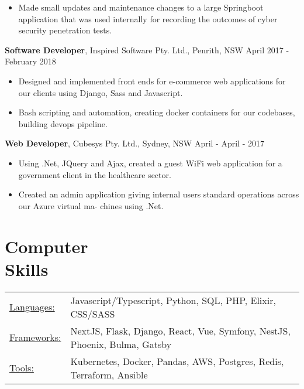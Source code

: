 \documentclass[overlapped]{res}
\begin{document}
\begin{resume}
\begin{itemize}
\item Made small updates and maintenance changes to a large Springboot application that was used internally for recording the outcomes of cyber security penetration tests.

\end{itemize}

{\bf Software Developer},
	Inspired Software Pty. Ltd., Penrith, NSW \hfill April 2017 - February 2018
\begin{itemize} \itemsep 2pt  %

\item Designed and implemented front ends for e-commerce web applications for our clients using Django, Sass and Javascript.

\item Bash scripting and automation, creating docker containers for our codebases, building devops pipeline.

\end{itemize}

 {\bf Web Developer},
	Cubesys Pty. Ltd., Sydney, NSW \hfill April - April - 2017
 \begin{itemize} \itemsep 2pt  %

\item Using .Net, JQuery and Ajax, created a guest WiFi web application for a government client in the
healthcare sector.

\item Created an admin application giving internal users standard operations across our Azure virtual ma- chines using .Net.

 \end{itemize}


\section{Computer \\ Skills}
   \begin{tabular}{l p{3in}}
    \underline{Languages:} & Javascript/Typescript, Python, SQL, PHP, Elixir, CSS/SASS \\
	\underline{Frameworks:} &  NextJS, Flask, Django, React, Vue, Symfony, NestJS, Phoenix, Bulma, Gatsby \\
	\underline{Tools:} &  Kubernetes, Docker, Pandas, AWS, Postgres, Redis, Terraform, Ansible \\
 \end{tabular}

\end{resume}
\end{document}
